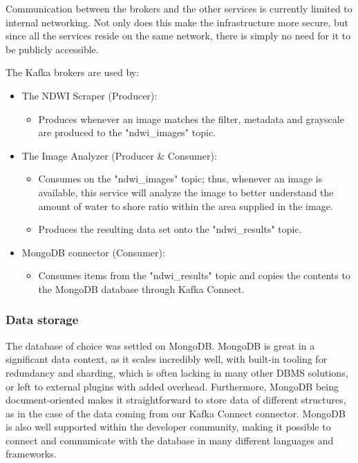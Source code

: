 Communication between the brokers and the other services is currently limited to internal networking. Not only does this make the infrastructure more secure, but since all the services reside on the same network, there is simply no need for it to be publicly accessible.

The Kafka brokers are used by:
\begin{itemize}
    \item The NDWI Scraper (Producer): 
    \begin{itemize}
        \item Produces whenever an image matches the filter, metadata and grayscale are produced to the "ndwi\_images" topic.
    \end{itemize}
    \item The Image Analyzer (Producer & Consumer): 
    \begin{itemize}
        \item Consumes on the "ndwi\_images" topic; thus, whenever an image is available, this service will analyze the image to better understand the amount of water to shore ratio within the area supplied in the image.
        \item Produces the resulting data set onto the "ndwi\_results" topic.
    \end{itemize}
    \item MongoDB connector (Consumer):
    \begin{itemize}
        \item Consumes items from the "ndwi\_results" topic and copies the contents to the MongoDB database through Kafka Connect.
    \end{itemize}
\end{itemize}

\subsubsection{Data storage}

The database of choice was settled on MongoDB. MongoDB is great in a significant data context, as it scales incredibly well, with built-in tooling for redundancy and sharding, which is often lacking in many other DBMS solutions, or left to external plugins with added overhead. 
Furthermore, MongoDB being document-oriented makes it straightforward to store data of different structures, as in the case of the data coming from our Kafka Connect connector. 
MongoDB is also well supported within the developer community, making it possible to connect and communicate with the database in many different languages and frameworks. 

